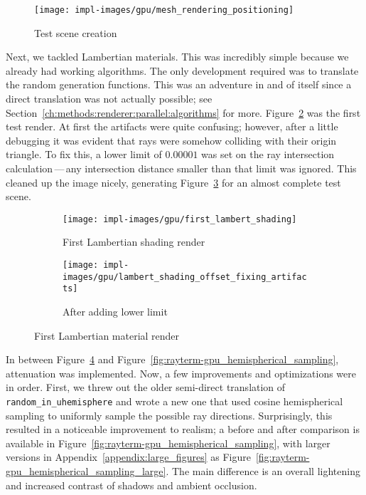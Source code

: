 \vspace{0.3em}
\begin{figure}[htb]
  \centering
  \texttt{[image: impl-images/gpu/mesh\_rendering\_positioning]}
  \caption{Test scene creation}
\label{fig:rayterm-gpu_test_scene_creation}
\end{figure}

Next, we tackled Lambertian materials.
This was incredibly simple because we already had working algorithms.
The only development required was to translate the random generation functions.
This was an adventure in and of itself since a direct translation was not actually possible; see Section~\ref{ch:methods:renderer:parallel:algorithms} for more.
Figure~\ref{fig:rayterm-gpu_artifacts} was the first test render.
At first the artifacts were quite confusing; however, after a little debugging it was evident that rays were somehow colliding with their origin triangle.
To fix this, a lower limit of $0.00001$ was set on the ray intersection calculation\,---\,any intersection distance smaller than that limit was ignored.
This cleaned up the image nicely, generating Figure~\ref{fig:rayterm-gpu_fixed_artifacts} for an almost complete test scene.

\vspace{0.3em}
\begin{figure}[htb]
  \centering
  \begin{subfigure}[htb]{0.45\textwidth}
    \texttt{[image: impl-images/gpu/first\_lambert\_shading]}
    \caption{First Lambertian shading render}
\label{fig:rayterm-gpu_artifacts}
  \end{subfigure}
  \begin{subfigure}[htb]{0.45\textwidth}
    \texttt{[image: impl-images/gpu/lambert\_shading\_offset\_fixing\_artifacts]}
    \caption{After adding lower limit}
\label{fig:rayterm-gpu_fixed_artifacts}
  \end{subfigure}
  \caption{First Lambertian material render}
\label{fig:rayterm-gpu_lambert}
\end{figure}

In between Figure~\ref{fig:rayterm-gpu_lambert} and Figure~\ref{fig:rayterm-gpu_hemispherical_sampling}, attenuation was implemented.
Now, a few improvements and optimizations were in order.
First, we threw out the older semi-direct translation of \texttt{random\_in\_uhemisphere} and wrote a new one that used cosine hemispherical sampling to uniformly sample the possible ray directions.
Surprisingly, this resulted in a noticeable improvement to realism; a before and after comparison is available in Figure~\ref{fig:rayterm-gpu_hemispherical_sampling}, with larger versions in Appendix~\ref{appendix:large_figures} as Figure~\ref{fig:rayterm-gpu_hemispherical_sampling_large}.
The main difference is an overall lightening and increased contrast of shadows and ambient occlusion.

